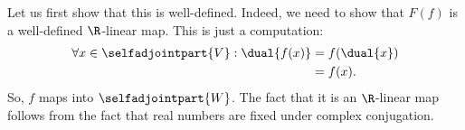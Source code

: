 %
%
\label {sol: functor from a star vector space to selfadjoint elements}Let us first show that this is well-defined. Indeed, we need to show that $F(f)$ is a well-defined $\R$-linear map. This is just a computation:
\begin{align*}
\forall x \in \selfadjointpart{V}: \dual{f(x)} &= f(\dual{x})\\
                                               &= f(x).
\end{align*}
So, $f$ maps into $\selfadjointpart{W}$. The fact that it is an $\R$-linear map follows from the fact that real numbers are fixed under complex conjugation.
